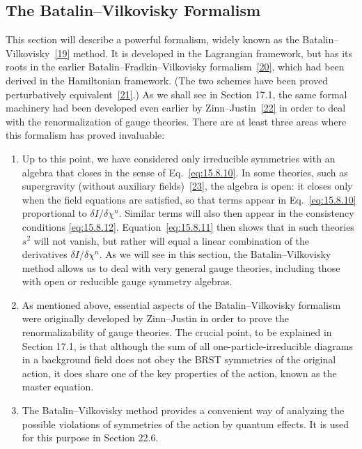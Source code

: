 \subsection[The Batalin--Vilkovisky Formalism]{The Batalin--Vilkovisky Formalism\footnotemark}

This section will describe a powerful formalism, widely known as the
Batalin--Vilkovisky~\hyperref[ch15-ref-19]{[19]} method. It is developed in the
Lagrangian framework, but has its roots in the earlier
Batalin--Fradkin--Vilkovisky formalism~\hyperref[ch15-ref-20]{[20]}, which had
been derived in the Hamiltonian framework. (The two schemes have been proved
perturbatively equivalent~\hyperref[ch15-ref-21]{[21]}.) As we shall see in
Section 17.1, the same formal machinery had been developed even earlier by
Zinn--Justin~\hyperref[ch15-ref-22]{[22]} in order to deal with the
renormalization of gauge theories. There are at least three areas where this
formalism has proved invaluable:

\begin{enumerate}
\item[(i)] Up to this point, we have considered only irreducible symmetries
with an algebra that closes in the sense of Eq.~\eqref{eq:15.8.10}. In some
theories, such as supergravity (without auxiliary fields)~\hyperref[ch15-ref-23]{[23]},
the algebra is open: it closes only when the field equations are satisfied,
so that terms appear in Eq.~\eqref{eq:15.8.10} proportional to
$\delta I/\delta\chi^n$. Similar terms will also then appear in the
consistency conditions \eqref{eq:15.8.12}. Equation~\eqref{eq:15.8.11} then
shows that in such theories $s^2$ will not vanish, but rather will equal a
linear combination of the derivatives $\delta I/\delta\chi^n$. As we will see
in this section, the Batalin--Vilkovisky method allows us to deal with very
general gauge theories, including those with open or reducible gauge symmetry
algebras.

\item[(ii)] As mentioned above, essential aspects of the
Batalin--Vilkovisky formalism were originally developed by Zinn--Justin in
order to prove the renormalizability of gauge theories. The crucial point, to
be explained in Section 17.1, is that although the sum of all
one-particle-irreducible diagrams in a background field does not obey the BRST
symmetries of the original action, it does share one of the key properties of
the action, known as the master equation.

\item[(iii)] The Batalin--Vilkovisky method provides a convenient way of
analyzing the possible violations of symmetries of the action by quantum
effects. It is used for this purpose in Section 22.6.
\end{enumerate}

